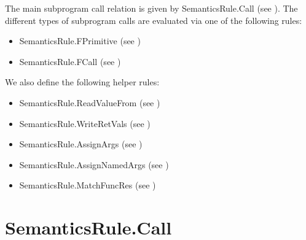 \documentclass{book}
\begin{document}
The main subprogram call relation is given by
SemanticsRule.Call (see ).
%
The different types of subprogram calls are evaluated via one of the following rules:
\begin{itemize}
\item SemanticsRule.FPrimitive (see )
\item SemanticsRule.FCall (see )
\end{itemize}

We also define the following helper rules:
\begin{itemize}
  \item SemanticsRule.ReadValueFrom (see )
  \item SemanticsRule.WriteRetVals (see )
  \item SemanticsRule.AssignArgs (see )
  \item SemanticsRule.AssignNamedArgs (see )
  \item SemanticsRule.MatchFuncRes (see )
\end{itemize}

\section{SemanticsRule.Call \label{sec:SemanticsRule.Call}}
\end{document}
